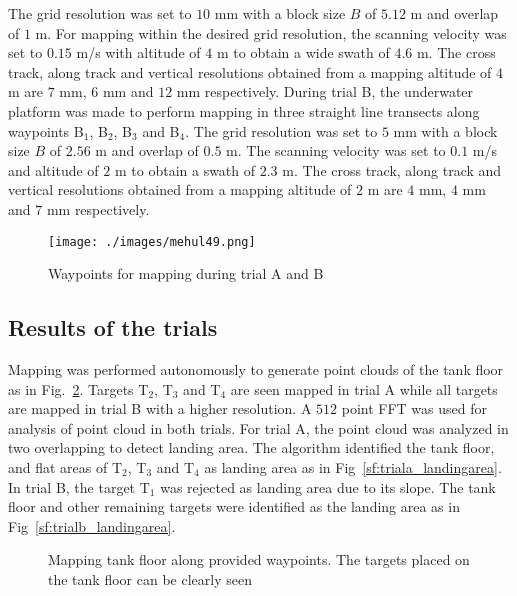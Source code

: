 The grid resolution was set to $10$ mm with a block size $B$ of $5.12$ m and overlap of $1$ m. For mapping within the desired grid resolution, the scanning velocity was set to $0.15$ m/s with altitude of $4$ m to obtain a wide swath of $4.6$ m. The cross track, along track and vertical resolutions obtained from a mapping altitude of $4$ m are $7$ mm, $6$ mm and $12$ mm respectively. During trial B, the underwater platform was made to perform mapping in three straight line transects along waypoints B$_1$, B$_2$, B$_3$ and B$_4$. The grid resolution was set to $5$ mm with a block size $B$ of $2.56$ m and overlap of $0.5$ m. The scanning velocity was set to $0.1$ m/s and altitude of $2$ m to obtain a swath of $2.3$ m. The cross track, along track and vertical resolutions obtained from a mapping altitude of $2$ m are $4$ mm, $4$ mm and $7$ mm respectively.

\begin{figure}[!ht]
\centering\texttt{[image: ./images/mehul49.png]}
\caption{Waypoints for mapping during trial A and B}
\label{f:trial_scene}
\end{figure}


\subsection{Results of the trials}

Mapping was performed autonomously to generate point clouds of the tank floor as in  Fig.~\ref{f:trial_bathy}. Targets T$_2$, T$_3$ and T$_4$ are seen mapped in trial A while all targets are mapped in trial B with a higher resolution. A $512$ point FFT was used for analysis of point cloud in both trials. For trial A, the point cloud was analyzed in two overlapping to detect landing area. The algorithm identified the tank floor, and flat areas of  T$_2$, T$_3$ and T$_4$ as landing area as in Fig~\ref{sf:triala_landingarea}. In trial B, the target T$_1$ was rejected as landing area due to its slope. The tank floor and other remaining targets were identified as the landing area as in Fig~\ref{sf:trialb_landingarea}.

\begin{figure}[!ht]
\centering
{}\quad
{}
\caption{Mapping tank floor along provided waypoints. The targets placed on the tank floor can be clearly seen}
\label{f:trial_bathy}
\end{figure}

